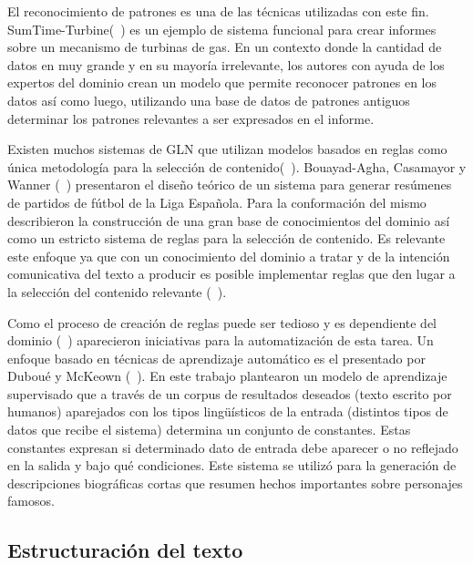     El reconocimiento de patrones es una de las t\'ecnicas utilizadas con este fin.  SumTime-Turbine(~\cite{Yu2006ChoosingTC}) es un ejemplo de sistema funcional para crear
 informes sobre un mecanismo de turbinas de gas. En un contexto donde la cantidad de datos en muy grande y en su mayoría irrelevante, 
 los autores con ayuda de los expertos del dominio crean un modelo que permite reconocer patrones en los datos así como luego, utilizando una base de datos de patrones 
antiguos determinar los patrones relevantes a ser expresados en el informe. 

    Existen muchos sistemas de GLN que utilizan modelos basados en reglas como \'unica metodolog\'ia para la selecci\'on de contenido(~\cite{reiter_dale_2000,Perera2017RecentAI}). Bouayad-Agha, Casamayor y 
Wanner (~\cite{BouayadAgha2011ContentSF}) presentaron el dise\~no te\'orico de un sistema para generar resúmenes de partidos de 
fútbol de la Liga Espa\~nola. Para la conformaci\'on del mismo describieron la construcci\'on de una gran base de conocimientos del dominio as\'i como 
un estricto sistema de reglas para la selecci\'on de contenido. Es relevante este enfoque ya que con un conocimiento del dominio a tratar y de la intenci\'on comunicativa del texto a producir 
es posible implementar reglas que den lugar a la selección del contenido relevante (~\cite{Reiter1997BuildingAN,reiter_dale_2000}). 

    Como el proceso de creaci\'on de reglas puede ser tedioso y es dependiente del dominio (~\cite{Reiter1997BuildingAN}) aparecieron iniciativas para la automatizaci\'on de esta tarea. Un enfoque 
basado en t\'ecnicas de aprendizaje autom\'atico es el presentado por Dubou\'e y McKeown (~\cite{Dubou2003StatisticalAO}). En este trabajo plantearon un modelo de aprendizaje supervisado que a trav\'es de
un corpus de resultados deseados (texto escrito por humanos) aparejados con los tipos lingüísticos de la entrada (distintos tipos de datos que recibe el sistema) determina un conjunto de constantes. Estas constantes 
expresan si determinado dato de entrada debe aparecer o no reflejado en la salida y bajo qué condiciones. Este sistema se utilizó para la generación de descripciones biográficas cortas que resumen hechos 
importantes sobre personajes famosos.

\subsection{Estructuración del texto}\label{subsection:estructuracion}

